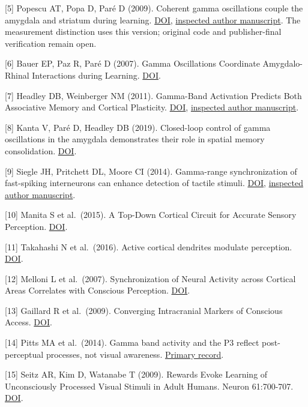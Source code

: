 \documentclass[
  american,
  11pt,
  letterpaper,
]{article}
\begin{document}
{[}5{]} Popescu AT, Popa D, Paré D (2009). Coherent gamma oscillations couple the amygdala and striatum during learning. \href{https://doi.org/10.1038/nn.2305}{DOI}, \href{https://pmc.ncbi.nlm.nih.gov/articles/PMC2737601/}{inspected author manuscript}. The measurement distinction uses this version; original code and publisher-final verification remain open.

{[}6{]} Bauer EP, Paz R, Paré D (2007). Gamma Oscillations Coordinate Amygdalo-Rhinal Interactions during Learning. \href{https://doi.org/10.1523/JNEUROSCI.2153-07.2007}{DOI}.

{[}7{]} Headley DB, Weinberger NM (2011). Gamma-Band Activation Predicts Both Associative Memory and Cortical Plasticity. \href{https://doi.org/10.1523/JNEUROSCI.2528-11.2011}{DOI}, \href{https://pmc.ncbi.nlm.nih.gov/articles/PMC3180928/}{inspected author manuscript}.

{[}8{]} Kanta V, Paré D, Headley DB (2019). Closed-loop control of gamma oscillations in the amygdala demonstrates their role in spatial memory consolidation. \href{https://doi.org/10.1038/s41467-019-11938-8}{DOI}.

{[}9{]} Siegle JH, Pritchett DL, Moore CI (2014). Gamma-range synchronization of fast-spiking interneurons can enhance detection of tactile stimuli. \href{https://doi.org/10.1038/nn.3797}{DOI}, \href{https://pmc.ncbi.nlm.nih.gov/articles/PMC4229565/}{inspected author manuscript}.

{[}10{]} Manita S et al.~(2015). A Top-Down Cortical Circuit for Accurate Sensory Perception. \href{https://doi.org/10.1016/j.neuron.2015.05.006}{DOI}.

{[}11{]} Takahashi N et al.~(2016). Active cortical dendrites modulate perception. \href{https://doi.org/10.1126/science.aah6066}{DOI}.

{[}12{]} Melloni L et al.~(2007). Synchronization of Neural Activity across Cortical Areas Correlates with Conscious Perception. \href{https://doi.org/10.1523/JNEUROSCI.4623-06.2007}{DOI}.

{[}13{]} Gaillard R et al.~(2009). Converging Intracranial Markers of Conscious Access. \href{https://doi.org/10.1371/journal.pbio.1000061}{DOI}.

{[}14{]} Pitts MA et al.~(2014). Gamma band activity and the P3 reflect post-perceptual processes, not visual awareness. \href{https://pubmed.ncbi.nlm.nih.gov/25063731/}{Primary record}.

{[}15{]} Seitz AR, Kim D, Watanabe T (2009). Rewards Evoke Learning of Unconsciously Processed Visual Stimuli in Adult Humans. Neuron 61:700-707. \href{https://doi.org/10.1016/j.neuron.2009.01.016}{DOI}.
\end{document}
